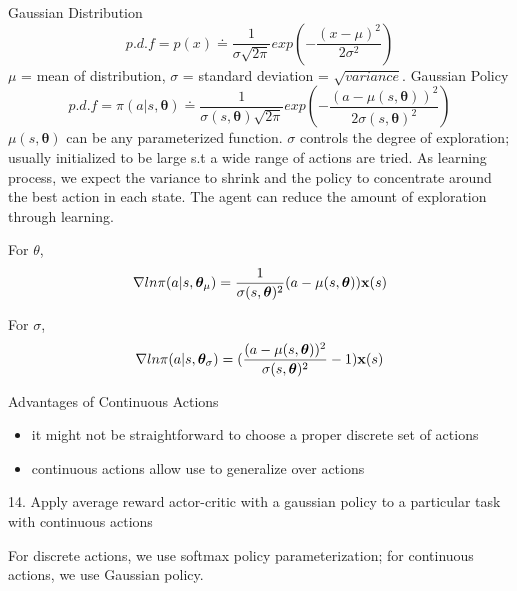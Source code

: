 \documentclass[sutton_barto_notes.tex]{subfiles}
\begin{document}
Gaussian Distribution
$$ p.d.f = p(x) \doteq \frac{1}{\sigma \sqrt{2\pi}}exp( -\frac{(x-\mu)^2}{2\sigma^2} )$$
$\mu$ = mean of distribution, $\sigma$ = standard deviation = $\sqrt{variance}$.
Gaussian Policy
$$ p.d.f = \pi(a|s,\bm{\theta}) \doteq \frac{1}{\sigma(s,\bm{\theta}) \sqrt{2\pi}}exp( -\frac{(a-\mu(s,\bm{\theta}))^2}{2\sigma(s,\bm{\theta})^2} )$$
$\mu(s,\bm{\theta})$ can be any parameterized function.
$\sigma$ controls the degree of exploration; usually initialized to be large s.t a wide range of actions are tried. As learning process, we expect the variance to shrink and the policy to concentrate around the best action in each state. The agent can reduce the amount of exploration through learning.

For $\theta$,
$$\nabla ln\pi(a|s, \bm{\theta}_\mu) = \frac{1}{\sigma(s,\bm{\theta})^2}(a-\mu(s,\bm{\theta})){\operatorname*{\mathbf{x}}}(s)$$

For $\sigma$,
$$\nabla ln\pi(a|s, \bm{\theta}_\sigma) = (\frac{( a- \mu(s,\bm{\theta}) )^2}{\sigma(s,\bm{\theta})^2} - 1) {\operatorname*{\mathbf{x}}}(s)$$

Advantages of Continuous Actions
\begin{itemize}
\item it might not be straightforward to choose a proper discrete set of actions
\item continuous actions allow use to generalize over actions
\end{itemize}


14. Apply average reward actor-critic with a gaussian policy to a particular task with continuous actions

For discrete actions, we use softmax policy parameterization; for continuous actions, we use Gaussian policy.
\end{document}
